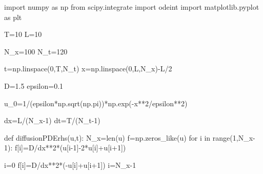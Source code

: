 \documentclass[
  letterpaper,
  DIV=11,
  numbers=noendperiod]{scrreprt}
\newenvironment{Shaded}{\begin{snugshade}}{\end{snugshade}}
\newcommand{\BuiltInTok}[1]{\textcolor[rgb]{0.00,0.23,0.31}{#1}}
\newcommand{\ControlFlowTok}[1]{\textcolor[rgb]{0.00,0.23,0.31}{#1}}
\newcommand{\DecValTok}[1]{\textcolor[rgb]{0.68,0.00,0.00}{#1}}
\newcommand{\FloatTok}[1]{\textcolor[rgb]{0.68,0.00,0.00}{#1}}
\newcommand{\ImportTok}[1]{\textcolor[rgb]{0.00,0.46,0.62}{#1}}
\newcommand{\KeywordTok}[1]{\textcolor[rgb]{0.00,0.23,0.31}{#1}}
\newcommand{\NormalTok}[1]{\textcolor[rgb]{0.00,0.23,0.31}{#1}}
\newcommand{\OperatorTok}[1]{\textcolor[rgb]{0.37,0.37,0.37}{#1}}
\theoremstyle{plain}
\theoremstyle{definition}
\theoremstyle{plain}
\theoremstyle{remark}
\begin{document}
\begin{Shaded}
\begin{Highlighting}[]
\ImportTok{import}\NormalTok{ numpy }\ImportTok{as}\NormalTok{ np}
\ImportTok{from}\NormalTok{ scipy.integrate }\ImportTok{import}\NormalTok{ odeint}
\ImportTok{import}\NormalTok{ matplotlib.pyplot }\ImportTok{as}\NormalTok{ plt}

\NormalTok{T}\OperatorTok{=}\DecValTok{10}
\NormalTok{L}\OperatorTok{=}\DecValTok{10}

\NormalTok{N\_x}\OperatorTok{=}\DecValTok{100}
\NormalTok{N\_t}\OperatorTok{=}\DecValTok{120}

\NormalTok{t}\OperatorTok{=}\NormalTok{np.linspace(}\DecValTok{0}\NormalTok{,T,N\_t)}
\NormalTok{x}\OperatorTok{=}\NormalTok{np.linspace(}\DecValTok{0}\NormalTok{,L,N\_x)}\OperatorTok{{-}}\NormalTok{L}\OperatorTok{/}\DecValTok{2}

\NormalTok{D}\OperatorTok{=}\FloatTok{1.5}
\NormalTok{epsilon}\OperatorTok{=}\FloatTok{0.1}

\NormalTok{u\_0}\OperatorTok{=}\DecValTok{1}\OperatorTok{/}\NormalTok{(epsilon}\OperatorTok{*}\NormalTok{np.sqrt(np.pi))}\OperatorTok{*}\NormalTok{np.exp(}\OperatorTok{{-}}\NormalTok{x}\OperatorTok{**}\DecValTok{2}\OperatorTok{/}\NormalTok{epsilon}\OperatorTok{**}\DecValTok{2}\NormalTok{)}

\NormalTok{dx}\OperatorTok{=}\NormalTok{L}\OperatorTok{/}\NormalTok{(N\_x}\OperatorTok{{-}}\DecValTok{1}\NormalTok{)}
\NormalTok{dt}\OperatorTok{=}\NormalTok{T}\OperatorTok{/}\NormalTok{(N\_t}\OperatorTok{{-}}\DecValTok{1}\NormalTok{)}


\KeywordTok{def}\NormalTok{ diffusionPDErhs(u,t):}
\NormalTok{    N\_x}\OperatorTok{=}\BuiltInTok{len}\NormalTok{(u)}
\NormalTok{    f}\OperatorTok{=}\NormalTok{np.zeros\_like(u)}
    \ControlFlowTok{for}\NormalTok{ i }\KeywordTok{in} \BuiltInTok{range}\NormalTok{(}\DecValTok{1}\NormalTok{,N\_x}\OperatorTok{{-}}\DecValTok{1}\NormalTok{):}
\NormalTok{      f[i]}\OperatorTok{=}\NormalTok{D}\OperatorTok{/}\NormalTok{dx}\OperatorTok{**}\DecValTok{2}\OperatorTok{*}\NormalTok{(u[i}\OperatorTok{{-}}\DecValTok{1}\NormalTok{]}\OperatorTok{{-}}\DecValTok{2}\OperatorTok{*}\NormalTok{u[i]}\OperatorTok{+}\NormalTok{u[i}\OperatorTok{+}\DecValTok{1}\NormalTok{])  }


\NormalTok{    i}\OperatorTok{=}\DecValTok{0}
\NormalTok{    f[i]}\OperatorTok{=}\NormalTok{D}\OperatorTok{/}\NormalTok{dx}\OperatorTok{**}\DecValTok{2}\OperatorTok{*}\NormalTok{(}\OperatorTok{{-}}\NormalTok{u[i]}\OperatorTok{+}\NormalTok{u[i}\OperatorTok{+}\DecValTok{1}\NormalTok{])}
\NormalTok{    i}\OperatorTok{=}\NormalTok{N\_x}\OperatorTok{{-}}\DecValTok{1}


\end{Highlighting}
\end{Shaded}
\end{document}

